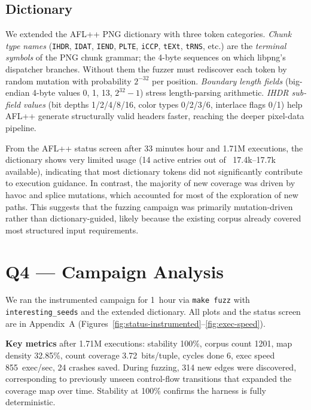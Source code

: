 \documentclass[letterpaper,twocolumn,10pt]{article}
\begin{document}
\subsection{Dictionary}

We extended the AFL++ PNG dictionary with three token categories.
\emph{Chunk type names} (\texttt{IHDR}, \texttt{IDAT}, \texttt{IEND},
\texttt{PLTE}, \texttt{iCCP}, \texttt{tEXt}, \texttt{tRNS}, etc.)
are the \emph{terminal symbols} of the PNG chunk grammar; the
4-byte sequences on which libpng's dispatcher branches. Without them
the fuzzer must rediscover each token by random mutation with
probability $2^{-32}$ per position. \emph{Boundary length fields}
(big-endian 4-byte values 0, 1, 13, $2^{32}-1$) stress
length-parsing arithmetic. \emph{IHDR sub-field values} (bit depths
1/2/4/8/16, color types 0/2/3/6, interlace flags 0/1) help AFL++
generate structurally valid headers faster, reaching the deeper
pixel-data pipeline.

From the AFL++ status screen after 33 minutes hour and 1.71M executions, the dictionary shows very limited usage (14 active entries out of ~17.4k–17.7k available), indicating that most dictionary tokens did not significantly contribute to execution guidance. In contrast, the majority of new coverage was driven by havoc and splice mutations, which accounted for most of the exploration of new paths. This suggests that the fuzzing campaign was primarily mutation-driven rather than dictionary-guided, likely because the existing corpus already covered most structured input requirements.

\section{Q4 --- Campaign Analysis}
\label{sec:q4}

We ran the instrumented campaign for 1~hour via \texttt{make fuzz}
with \texttt{interesting\_seeds} and the extended dictionary. All
plots and the status screen are in Appendix~A
(Figures~\ref{fig:status-instrumented}--\ref{fig:exec-speed}).

\textbf{Key metrics} after 1.71M executions: stability 100\%,
corpus count 1201, map density 32.85\%, count coverage
3.72~bits/tuple, cycles done 6, exec speed 855~exec/sec, 24
crashes saved. During fuzzing, 314 new edges were discovered, corresponding to previously unseen control-flow transitions that expanded the coverage map over time. Stability at 100\% confirms the harness is fully deterministic.
\end{document}
